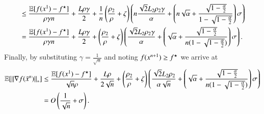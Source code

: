 \begin{appendixproof}
\begin{equation}
\begin{aligned}
                &\leq \frac{\mathbb{E}[f(x^{1})-f^\star]}{\rho\gamma n} +\frac{L\rho\gamma}{2} + \frac{1}{n}\left(\frac{\rho_2}{\rho}+\zeta\right)\left(n\frac{\sqrt{2}L_2\rho_2\gamma}{\alpha} + \left(n\sqrt{\alpha} + \frac{\sqrt{1-\frac{\alpha}{2}}}{1-\sqrt{1-\frac{\alpha}{2}}}\right)\sigma\right)\\
                &= \frac{\mathbb{E}[f(x^{1})-f^\star]}{\rho\gamma n} +\frac{L\rho\gamma}{2} + \left(\frac{\rho_2}{\rho}+\zeta\right)\left(\frac{\sqrt{2}L_2\rho_2\gamma}{\alpha} + \left(\sqrt{\alpha} + \frac{\sqrt{1-\frac{\alpha}{2}}}{n(1-\sqrt{1-\frac{\alpha}{2}})}\right)\sigma\right).
        \end{aligned}
    \end{equation}
    Finally, by substituting $\gamma = \frac{1}{\sqrt{n}}$ and noting $f(x^{n+1}) \geq f^\star$ we arrive at
    \begin{equation*}
        \begin{aligned}
            \mathbb{E}[\left\Vert{\nabla f(\bar{x}^n)}\right\Vert_{\ast}]
                &\leq \frac{\mathbb{E}[f(x^{1})-f^\star]}{\sqrt{n}\rho} +\frac{L\rho}{2\sqrt{n}} + \left(\frac{\rho_2}{\rho}+\zeta\right)\left(\frac{\sqrt{2}L_2\rho_2}{\alpha\sqrt{n}} + \left(\sqrt{\alpha} + \frac{\sqrt{1-\frac{\alpha}{2}}}{n(1-\sqrt{1-\frac{\alpha}{2}})}\right)\sigma\right)\\
                &= O\left(\frac{1}{\sqrt{n}} + \sigma\right).
        \end{aligned}
    \end{equation*}
\end{appendixproof}

